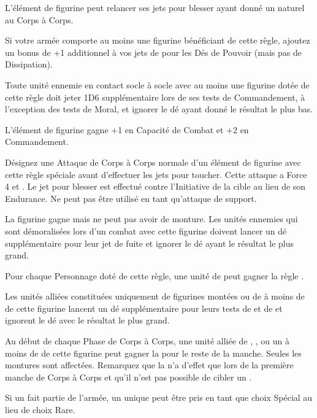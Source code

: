 \startarmyspecialrules

\armyspecialruleentry{\killerinstinct}

L'élément de figurine peut relancer ses jets pour blesser ayant donné un  naturel au Corps à Corps.

\armyspecialruleentry{\masterofthedarkarts}

Si votre armée comporte au moins une figurine bénéficiant de cette règle, ajoutez un bonus de +1 additionnel à vos jets de \channel{} pour les Dés de Pouvoir (mais pas de Dissipation).

\armyspecialruleentry{\auraofdespair}

Toute unité ennemie en contact socle à socle avec au moins une figurine dotée de cette règle doit jeter 1D6 supplémentaire lors de ses tests de Commandement, à l'exception des tests de Moral, et ignorer le dé ayant donné le résultat le plus bas.

\armyspecialruleentry{\alphapredator}

L'élément de figurine gagne +1 en Capacité de Combat et +2 en Commandement.

\armyspecialruleentry{\petrifyingstare}

Désignez une Attaque de Corps à Corps normale d'un élément de figurine avec cette règle spéciale avant d'effectuer les jets pour toucher. Cette attaque a Force 4 et . Le jet pour blesser est effectué contre l'Initiative de la cible au lieu de son Endurance. Ne peut pas être utilisé en tant qu'attaque de support.

\begin{multicols}{2}\raggedcolumns
\armyspecialruleentry{\fleetcommander}

La figurine gagne  mais ne peut pas avoir de monture. Les unités ennemies qui sont démoralisées lors d'un combat avec cette figurine doivent lancer un dé supplémentaire pour leur jet de fuite et ignorer le dé ayant le résultat le plus grand.

Pour chaque Personnage doté de cette règle, une unité de \corsairs{} peut gagner la règle \vanguard{}.

\columnbreak
\armyspecialruleentry{\beastmaster}

Les unités alliées constituées uniquement de figurines montées ou de \monsters{} à moins de  de cette figurine lancent un dé supplémentaire pour leurs tests de \frenzy{} et de \stupidity{} et ignorent le dé avec le résultat le plus grand.

Au début de chaque Phase de Corps à Corps, une unité alliée de \cavalry{}, \chariot{}, \monstrouscavalry{} ou un \monster{} à moins de  de cette figurine peut gagner la \hatred{} pour le reste de la manche. Seules les montures sont affectées. Remarquez que la \hatred{} n'a d'effet que lors de la première manche de Corps à Corps et qu'il n'est pas possible de cibler un \riddenmonster{}.

Si un \beastmaster{} fait partie de l'armée, un unique \kraken{} peut être pris en tant que choix Spécial au lieu de choix Rare.

\end{multicols}

